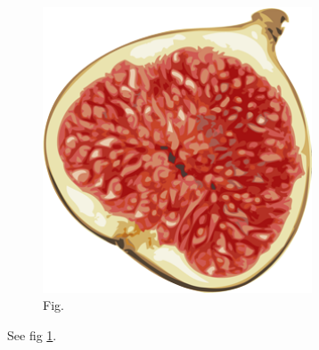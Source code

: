 
  \begin{figure}[h]
    \includegraphics[width=8cm]{fig.png}
    \caption{Fig.}
    \label{fig:fig}
  \end{figure}
  See fig \ref{fig:fig}.

